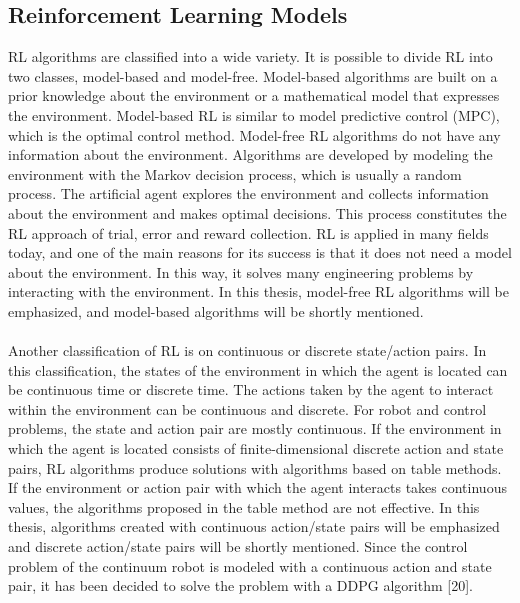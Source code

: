\documentclass[12pt,twoside,a4]{mwbk}
\begin{document}
\subsection{Reinforcement Learning Models}
RL algorithms are classified into a wide variety. It is possible to divide RL into two classes, model-based and model-free. Model-based algorithms are built on a prior knowledge about the environment or a mathematical model that expresses the environment. Model-based RL is similar to model predictive control (MPC), which is the optimal control method. Model-free RL algorithms do not have any information about the environment. Algorithms are developed by modeling the environment with the Markov decision process, which is usually a random process. The artificial agent explores the environment and collects information about the environment and makes optimal decisions. This process constitutes the RL approach of trial, error and reward collection. RL is applied in many fields today, and one of the main reasons for its success is that it does not need a model about the environment. In this way, it solves many engineering problems by interacting with the environment. In this thesis, model-free RL algorithms will be emphasized, and model-based algorithms will be shortly mentioned.
\\ \\
Another classification of RL is on continuous or discrete state/action pairs. In this classification, the states of the environment in which the agent is located can be continuous time or discrete time. The actions taken by the agent to interact within the environment can be continuous and discrete. For robot and control problems, the state and action pair are mostly continuous. If the environment in which the agent is located consists of finite-dimensional discrete action and state pairs, RL algorithms produce solutions with algorithms based on table methods. If the environment or action pair with which the agent interacts takes continuous values, the algorithms proposed in the table method are not effective. In this thesis, algorithms created with continuous action/state pairs will be emphasized and discrete action/state pairs will be shortly mentioned. Since the control problem of the continuum robot is modeled with a continuous action and state pair, it has been decided to solve the problem with a DDPG algorithm [20].
\\ \\
\end{document}
